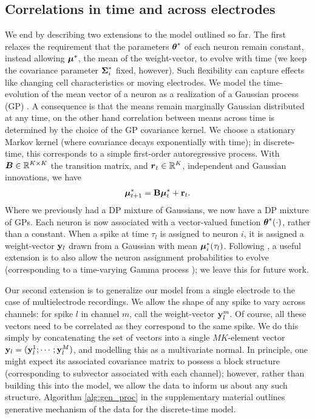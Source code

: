 \subsection{Correlations in time and across electrodes}
We end by describing two extensions to the model outlined so far. 
The first relaxes the requirement that the parameters $\boldsymbol{\theta}^*$ of each neuron remain constant, instead allowing $\boldsymbol{\mu}^*$, the mean of the weight-vector,
to evolve with time (we keep the covariance parameter $\boldsymbol{\Sigma}^*_i$ fixed, however). Such flexibility can capture effects like changing cell 
characteristics or moving electrodes.
We model the time-evolution of the mean vector of a neuron as a realization of a Gaussian process (GP) \citep{RasWil2006}. A consequence is that the 
means remain marginally Gaussian distributed at any time, on the other hand correlation between means across time is determined by the choice 
of the GP covariance kernel.
We choose a stationary Markov kernel (where covariance decays exponentially with time); in discrete-time, this corresponds to a simple first-order 
autoregressive process. With $\boldsymbol{B} \in \mathbb{R}^{K \times K}$ the transition matrix, and $\boldsymbol{r}_t \in \mathbb{R}^K$, 
independent and Gaussian {innovations}, we have
\begin{align}
  \boldsymbol{\mu}^*_{t+1} = \mathbf{B} \boldsymbol{\mu}^*_t + \mathbf{r}_t.
\end{align}
Where we previously had a DP mixture of Gaussians, we now have a DP mixture of GPs. Each neuron is now associated with a vector-valued function 
$\boldsymbol{\theta}^*(\cdot)$, rather than a constant. When a spike at time $\tau_l$ is assigned to neuron $i$, it is assigned a weight-vector $\mathbf{y}_l$ drawn from a 
Gaussian with mean $\boldsymbol{\mu}^*_i(\tau_l)$. Following \citep{wood2009}, a useful extension is to also allow the neuron assignment probabilities to evolve 
(corresponding to a time-varying Gamma process \citep{RaoTeh2009a}); we leave this for future work.

Our second extension is to generalize our model from a single electrode to the case of multielectrode recordings. 
We allow the shape of any spike to vary across channels: for spike $l$ in channel $m$, call the weight-vector $\mathbf{y}^m_l$.
Of course, all these vectors need to be correlated as they correspond to the same spike. We do this simply by concatenating the set of vectors into
a single $MK$-element vector $\mathbf{y}_l = (\mathbf{y}^1_l;\cdots;\mathbf{y}^M_l)$, and modelling this as a multivariate normal. In principle, one might expect its associated 
covariance matrix to possess a block structure (corresponding to subvector associated with each channel); however, rather than building this into the model,
we allow the data to inform us about any such structure.
Algorithm \ref{alg:gen_proc} in the supplementary material outlines generative mechanism of the data for the discrete-time model.

